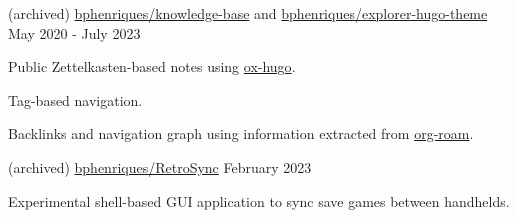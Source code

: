 \begin{cventries}
  \vspace{2mm}  

  \openSourceEntry
    {(archived) \href{https://github.com/bphenriques/knowledge-base}{bphenriques/knowledge-base} and \href{https://github.com/bphenriques/explorer-hugo-theme}{bphenriques/explorer-hugo-theme}}
    {May 2020 - July 2023}
    {    
    \begin{openSourceItems}
        \item Public Zettelkasten-based notes using \href{https://ox-hugo.scripter.co/}{ox-hugo}.
        \item Tag-based navigation.
        \item Backlinks and navigation graph using information extracted from \href{https://www.orgroam.com/}{org-roam}.
    \end{openSourceItems}
    \vspace{4mm}
    }

  \vspace{2mm}

    
\openSourceEntry
    {(archived) \href{https://github.com/bphenriques/knowledge-base}{bphenriques/RetroSync}}
    {February 2023}
    {   
    \begin{openSourceDescription}
    Experimental shell-based GUI application to sync save games between handhelds.
    \end{openSourceDescription}
    \vspace{4mm}
    }

  \vspace{2mm}


\end{cventries}
